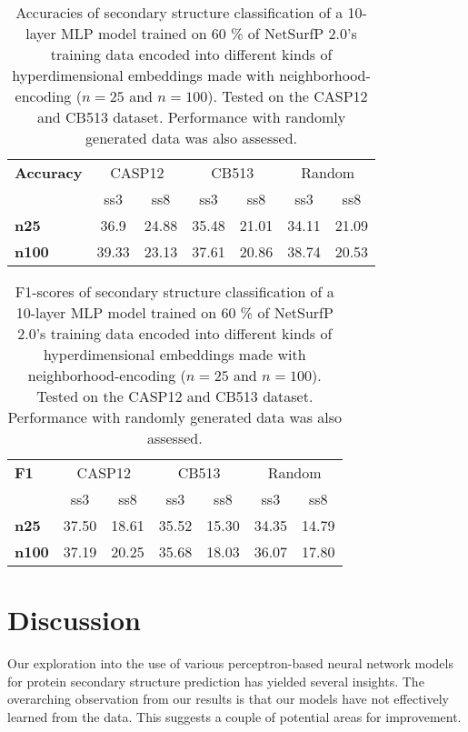 \begin{table}[h]
    \caption{Accuracies of secondary structure classification of a 10-layer MLP model trained on 60 \% of NetSurfP 2.0's training data encoded into different kinds of hyperdimensional embeddings made with neighborhood-encoding ($n = 25$ and $n=100$). Tested on the CASP12 and CB513 dataset. Performance with randomly generated data was also assessed.}
    \label{tab:casp}
    \centering
    \begin{tabular}{l|cc|cc|cc}
        \toprule
        \textbf{Accuracy} & \multicolumn{2}{c|}{CASP12} & \multicolumn{2}{c|}{CB513} & \multicolumn{2}{c|}{Random}\\
        & ss3 & ss8 & ss3 & ss8 & ss3 & ss8\\
        \midrule
        \textbf{n25} & 36.9 & 24.88 & 35.48 & 21.01 & 34.11 & 21.09 \\
        \textbf{n100} & 39.33 & 23.13 & 37.61 & 20.86 & 38.74 & 20.53\\
        \bottomrule
    \end{tabular}
\end{table}

\begin{table}[h]
    \caption{F1-scores of secondary structure classification of a 10-layer MLP model trained on 60 \% of NetSurfP 2.0's training data encoded into different kinds of hyperdimensional embeddings made with neighborhood-encoding ($n = 25$ and $n=100$). Tested on the CASP12 and CB513 dataset. Performance with randomly generated data was also assessed.}
    \label{tab:casp2}
    \centering
    \begin{tabular}{l|cc|cc|cc}
        \toprule
        \textbf{F1} & \multicolumn{2}{c|}{CASP12} & \multicolumn{2}{c|}{CB513} & \multicolumn{2}{c}{Random}\\
        & ss3 & ss8 & ss3 & ss8 & ss3 & ss8 \\
        \midrule
        \textbf{n25} & 37.50 & 18.61 & 35.52 & 15.30 & 34.35 & 14.79\\
        \textbf{n100} & 37.19 & 20.25 & 35.68 & 18.03 & 36.07 & 17.80\\
        \bottomrule
    \end{tabular}
\end{table}

\section{Discussion}
Our exploration into the use of various perceptron-based neural network models for protein secondary structure prediction has yielded several insights. The overarching observation from our results is that our models have not effectively learned from the data. This suggests a couple of potential areas for improvement.

